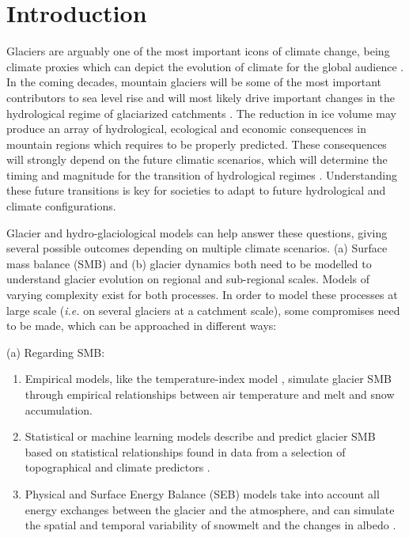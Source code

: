 \section{Introduction} \label{methods:intro}

Glaciers are arguably one of the most important icons of climate change, being climate proxies which can depict the evolution of climate for the global audience \citep{ipcc_climate_2018}. In the coming decades, mountain glaciers will be some of the most important contributors to sea level rise and will most likely drive important changes in the hydrological regime of glaciarized catchments \citep{beniston_european_2018, vuille_rapid_2018, hock_glaciermip_2019}. The reduction in ice volume may produce an array of hydrological, ecological and economic consequences in mountain regions which requires to be properly predicted. These consequences will strongly depend on the future climatic scenarios, which will determine the timing and magnitude for the transition of hydrological regimes \citep{huss_global-scale_2018}. Understanding these future transitions is key for societies to adapt to future hydrological and climate configurations. 

Glacier and hydro-glaciological models can help answer these questions, giving several possible outcomes depending on multiple climate scenarios. (a) Surface mass balance (SMB) and (b) glacier dynamics both need to be modelled to understand glacier evolution on regional and sub-regional scales. Models of varying complexity exist for both processes. In order to model these processes at large scale (\textit{i.e.} on several glaciers at a catchment scale), some compromises need to be made, which can be approached in different ways:

(a) Regarding SMB:

\begin{enumerate}
\item Empirical models, like the temperature-index model \citep[e.g.][]{hock_temperature_2003}, simulate glacier SMB through empirical relationships between air temperature and melt and snow accumulation. 
\item Statistical or machine learning models describe and predict glacier SMB based on statistical relationships found in data from a selection of topographical and climate predictors \citep[e.g.][]{martin_correlation_1974, steiner_application_2005}.
\item Physical and Surface Energy Balance (SEB) models take into account all energy exchanges between the glacier and the atmosphere, and can simulate the spatial and temporal variability of snowmelt and the changes in albedo \citep[e.g.][]{gerbaux_surface_2005}.
\end{enumerate}

